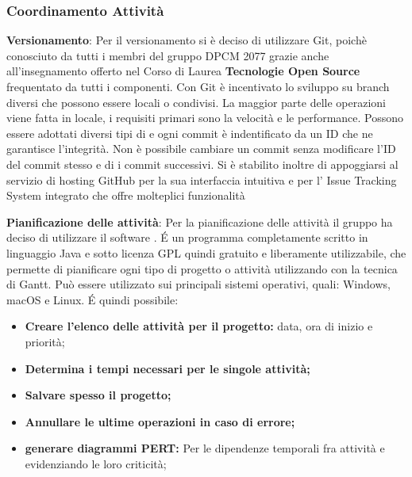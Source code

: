 \subsubsection{Coordinamento Attività}
\begin{description}
\item{\textbf{Versionamento}}: Per il versionamento si è deciso di utilizzare Git, poichè conosciuto da tutti i membri del gruppo DPCM 2077 grazie anche all'insegnamento offerto
nel Corso di Laurea \textbf{Tecnologie Open Source} frequentato da tutti i componenti. Con Git è incentivato lo sviluppo su branch diversi che possono essere locali o condivisi.
La maggior parte delle operazioni viene fatta in locale, i requisiti primari sono la velocità e le performance.
Possono essere adottati diversi tipi di  e ogni commit è indentificato da un ID che ne garantisce l'integrità.
Non è possibile cambiare un commit senza modificare l’ID del commit stesso e di i commit successivi.  
Si è stabilito inoltre di appoggiarsi al servizio di hosting GitHub per la sua interfaccia intuitiva e per l' Issue Tracking System integrato che offre molteplici funzionalità

\item{\textbf{Pianificazione delle attività}}:  Per la pianificazione delle attività il gruppo ha deciso di utilizzare il software \textbf{}. 
\'E un programma completamente scritto in linguaggio Java e sotto licenza GPL quindi gratuito e liberamente utilizzabile, che permette di pianificare ogni tipo di progetto o attività utilizzando con la tecnica di Gantt.
Può essere utilizzato sui principali sistemi operativi, quali: Windows, macOS e Linux.
\'E quindi possibile:
\begin{itemize}
\item{\textbf{Creare l'elenco delle attività per il progetto:} data, ora di inizio e priorità;}
\item{\textbf{Determina i tempi necessari per le singole attività;}}
\item{\textbf{Salvare spesso il progetto;}}
\item{\textbf{Annullare le ultime operazioni in caso di errore;}}
\item{\textbf{generare diagrammi PERT:} Per le dipendenze temporali fra attività e evidenziando le loro criticità;}
\end{itemize} 


\end{description}
